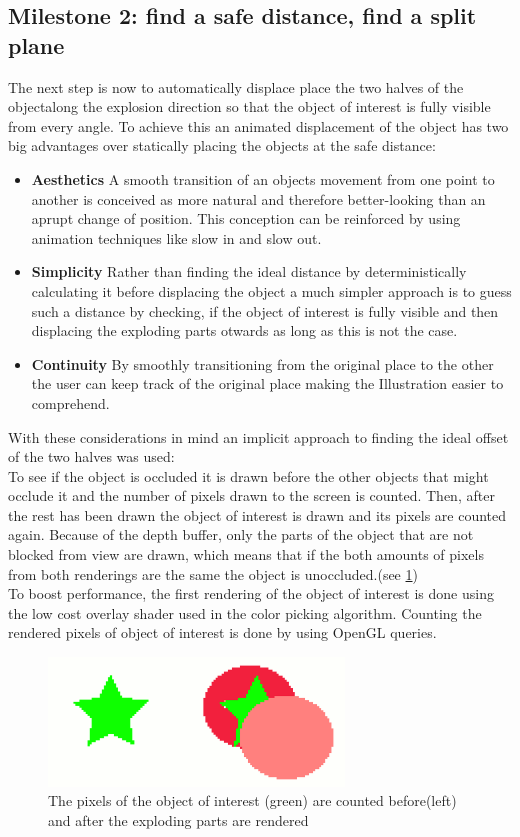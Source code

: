 \subsection{Milestone 2: find a safe distance, find a split plane} 
The next step is now to automatically displace place the two halves of the objectalong the explosion direction so that the object of interest is fully visible from every angle. To achieve this an animated displacement of the object has two big advantages over statically placing the objects at the safe distance:\\
\begin{itemize}
\item \textbf{Aesthetics} A smooth transition of an objects movement from one point to another is conceived as more natural and therefore better-looking than an aprupt change of position. This conception can be reinforced by using animation techniques like slow in and slow out.\cite{misc:siggraphAnim}
\item \textbf{Simplicity} Rather than finding the ideal distance by deterministically calculating it before displacing the object a much simpler approach is to guess such a distance by checking, if the object of interest is fully visible and then displacing the exploding parts otwards as long as this is not the case.
\item \textbf{Continuity} By smoothly transitioning from the original place to the other the user can keep track of the original place making the Illustration easier to comprehend.
\end{itemize}
With these considerations in mind an implicit approach to finding the ideal offset of the two halves was used:\\
To see if the object is occluded it is drawn before the other objects that might occlude it and the number of pixels drawn to the screen is counted. Then, after the rest has been drawn the object of interest is drawn and its pixels are counted again. Because of the depth buffer, only the parts of the object that are not blocked from view are drawn, which means that if the both amounts of pixels from both renderings are the same the object is unoccluded.(see \ref{fig:occlusionquery})\\
To boost performance, the first rendering of the object of interest is done using the low cost overlay shader used in the color picking algorithm. Counting the rendered pixels of object of interest is done by using OpenGL queries. \\
\begin{figure}[tb]
	\centering
	\includegraphics[width=0.7\textwidth]{chapters/figures/occlusion_query}
	\caption{The pixels of the object of interest (green) are counted before(left) and after the exploding parts are rendered}
	\label{fig:occlusionquery}
\end{figure}
